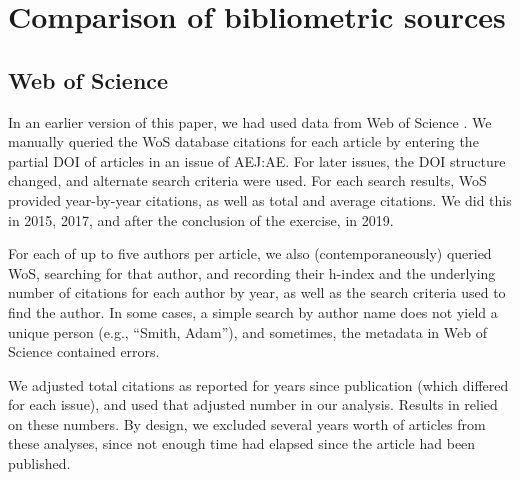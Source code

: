 \documentclass{cje_appendix} %
\theoremstyle{plain}%
\theoremstyle{definition}
\theoremstyle{remark}
\begin{document}
\FloatBarrier


\section{Comparison of bibliometric sources}
\label{app:wos-openalex}


\subsection{Web of Science}

In an earlier version of this paper, we had used data from Web of Science \citep[WoS]{WebofScience}.
We manually queried the WoS  database citations for each article by entering the partial DOI of articles in an issue of AEJ:AE. For later issues, the DOI structure changed, and alternate search criteria were used. For each search results, WoS provided year-by-year citations, as well as total and average citations. We did this in 2015, 2017, and after the conclusion of the exercise, in 2019.

For each of up to five authors per article, we also (contemporaneously) queried WoS, searching for that author, and recording their h-index \citep{Hirsch2005} and the underlying number of citations for each author by year, as well as the search criteria used to find the author. In some cases, a simple search by author name does not yield a unique person (e.g.,  ``Smith, Adam''), and sometimes, the metadata in Web of Science contained errors.

We adjusted total citations as reported for years since publication (which differed for each issue), and used that adjusted number in our analysis. Results in \cite{kingi2018,herbert2021} relied on these numbers. By design, we excluded several years worth of articles from these analyses, since not enough time had elapsed since the article had been published.
\end{document}
